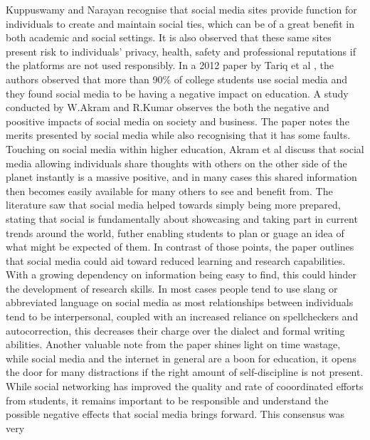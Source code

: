 \documentclass[lettersize,journal]{IEEEtran}
\begin{document}
    Kuppuswamy and Narayan \cite{Kuppuswamy et al 2010} recognise that social
    media sites provide function for individuals to create and maintain social
    ties, which can be of a great benefit in both academic and social settings.
    It is also observed that these same sites present risk to individuals'
    privacy, health, safety and professional reputations if the platforms are
    not used responsibly.
    In a 2012 paper by Tariq et al \cite{Tariq et al 2012}, the authors observed that more than 90\%
    of college students use social media 
    and they found social media to be having a negative impact on education. 
    A study conducted by W.Akram and R.Kumar \cite{Akram et al 2017} observes the both the negative
    and poositive impacts of social media on society and business.  The paper notes the merits presented by social media
    while also recognising that it has some faults. Touching on social media within higher education, Akram et al discuss that social media allowing individuals share thoughts with others on the other side of the planet instantly is a massive positive, and in many cases this shared information then becomes easily available for many others to see and benefit from. The literature saw that social media helped towards simply being more prepared, stating that social is fundamentally about showcasing and taking part in  current trends around the world, futher enabling students to plan or guage an idea of what might be expected of them. In contrast of those points, the paper outlines that social media could aid toward reduced learning and research capabilities. With a growing dependency on information being easy to find, this could hinder the development of research skills. In most cases people tend to use slang or abbreviated language on social media as most relationships between individuals tend to be interpersonal, coupled with an increased reliance on spellcheckers and autocorrection, this decreases their charge over the dialect and formal writing abilities. Another valuable note from the paper shines light on time wastage, while social media and the internet in general are a boon for education, it opens the door for many distractions if the right amount of self-discipline is not present. While social networking has improved the quality and rate of cooordinated efforts from students, it remains important to be responsible and understand the possible negative effects that social media brings forward. This consensus was very
\end{document}
